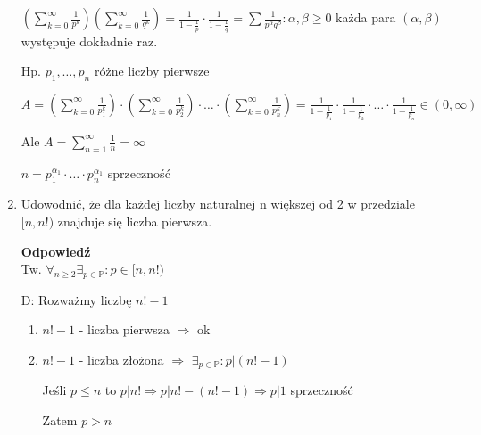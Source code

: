 \documentclass[12pt,a4paper]{article}
\theoremstyle{break}
\newcommand{\Odp}[1]{
		\begin{mdframed}[style=zadanie]
			\textbf{Odpowiedź}\\
			#1
		\end{mdframed}
	}
\begin{document}
\begin{enumerate}[1.]
{\begin{enumerate}[1)]
			$(\sum_{k=0}^{\infty}\frac{1}{p^k})(\sum_{k=0}^{\infty}\frac{1}{q^k}) = \frac{1}{1-\frac{1}{p}}\cdot\frac{1}{1-\frac{1}{q}}=\sum \frac{1}{p^\alpha q^\beta} : \alpha,\beta\geq 0$ każda para $(\alpha,\beta)$ występuje dokładnie raz.
		\end{enumerate}
		
		Hp. $p_1,\dots,p_n$ różne liczby pierwsze
		
		$A=(\sum_{k=0}^{\infty}\frac{1}{p_1^k})\cdot(\sum_{k=0}^{\infty}\frac{1}{p_2^k})\cdot\dots\cdot(\sum_{k=0}^{\infty}\frac{1}{p_n^k})=\frac{1}{1-\frac{1}{p_1}}\cdot\frac{1}{1-\frac{1}{p_2}}\cdot\dots\cdot\frac{1}{1-\frac{1}{p_n}}\in(0,\infty)$
		
		Ale $A=\sum_{n=1}^{\infty}\frac{1}{n}=\infty$
		
		$n=p_1^{\alpha_1}\cdot \dots \cdot p_n^{\alpha_1}$ sprzeczność
	}
	
	\item Udowodnić, że dla każdej liczby naturalnej n większej od 2 w przedziale $[n, n!)$ znajduje
	się liczba pierwsza.
	\Odp{
		Tw. $\forall_{n\geq 2} \exists_{p\in\mathbb{P}} : p\in [n,n!)$
		
		D: Rozważmy liczbę $n!-1$
		\begin{enumerate}[$1^\circ$]
			\item $n!-1$ - liczba pierwsza $\Rightarrow$ ok
			\item $n!-1$ - liczba złożona $\Rightarrow$ $\exists_{p\in\mathbb{P}} : p|(n!-1) $
			
			Jeśli $p\leq n$ to $p|n! \Rightarrow p|n!-(n!-1) \Rightarrow p|1$ sprzeczność
			
			Zatem $p>n$
		\end{enumerate}
	}
	

\end{enumerate}
\end{document}
